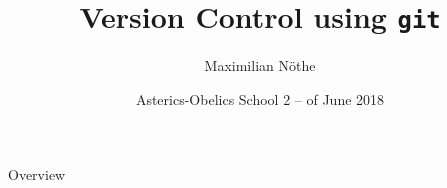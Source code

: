 \documentclass[
  aspectratio=1610,
]{beamer}
\author[M. Nöthe]{Maximilian Nöthe}
\title[VC with Git]{Version Control using \texttt{git}}
\date[June \nth{4}, 2018]{\nth{2} Asterics-Obelics School 2 – \nth{4} of June 2018 }
\institute[TU Dortmund]{Astroparticle Physics, TU Dortmund}
\begin{document}
\maketitle

\begin{frame}[c]{Overview}
\tableofcontents
\end{frame}






\end{document}
